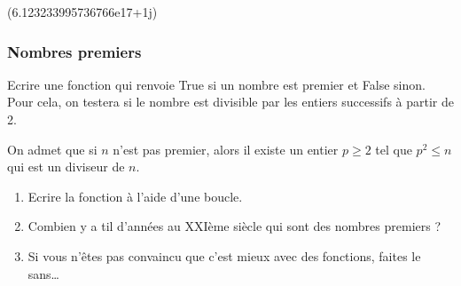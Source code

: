 \documentclass[letterpaper,10pt,english]{sphinxhowto}
\begin{document}
\begin{sphinxVerbatim}[commandchars=\\\{\}]
     

  
        
    
 
\end{sphinxVerbatim}

\begin{sphinxVerbatim}[commandchars=\\\{\}]
(6.123233995736766e\PYGZhy{}17+1j)
\end{sphinxVerbatim}


\subsubsection{Nombres premiers}
\label{\detokenize{cours1_fonctions_corr_exercices:nombres-premiers}}
\sphinxAtStartPar
Ecrire une fonction qui renvoie True si un nombre est premier et False sinon. Pour cela, on testera si le nombre
est divisible par les entiers successifs à partir de 2.

\sphinxAtStartPar
On admet que si \(n\) n’est pas premier, alors il existe un entier \(p \ge 2\) tel que \(p^2 \le n\) qui est un diviseur de \(n\).
\begin{enumerate}
%
\item {} 
\sphinxAtStartPar
Ecrire la fonction à l’aide d’une boucle.

\item {} 
\sphinxAtStartPar
Combien y a t\sphinxhyphen{}il d’années au XXIème siècle qui sont des nombres premiers ?

\item {} 
\sphinxAtStartPar
Si vous n’êtes pas convaincu que c’est mieux avec des fonctions, faites le sans…

\end{enumerate}
\end{document}
